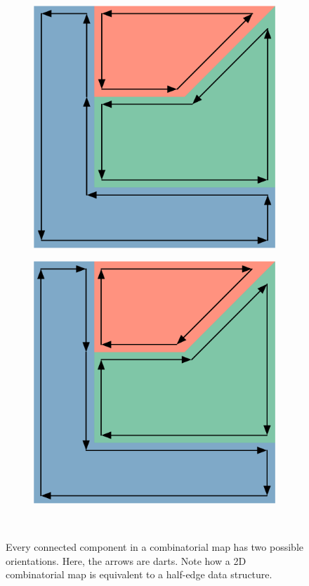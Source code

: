 \begin{figure}
\centering
\begin{subfigure}{0.33\linewidth}
\includegraphics[width=\linewidth]{figs/cmaps-orientation-1}
\caption{}%
\label{subfig:cmaps-orientation-1}
\end{subfigure}%
\quad
\begin{subfigure}{0.33\linewidth}
\includegraphics[width=\linewidth]{figs/cmaps-orientation-2}
\caption{}%
\label{subfig:cmaps-orientation-2}
\end{subfigure}\\
\caption{Every connected component in a combinatorial map has two possible orientations.
Here, the arrows are darts.
Note how a 2D combinatorial map is equivalent to a half-edge data structure.}%
\label{fig:cmaps-orientation}
\end{figure}

